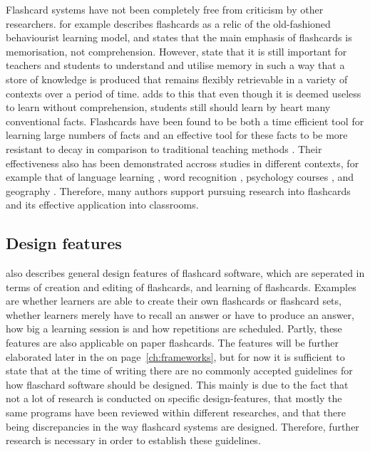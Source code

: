 Flashcard systems have not been completely free from criticism by other researchers.  for example describes flashcards as a relic of the old-fashioned behaviourist learning model, and  states that the main emphasis of flashcards is memorisation, not comprehension. However,  state that it is still important for teachers and students to understand and utilise memory in such a way that a store of knowledge is produced that remains flexibly retrievable in a variety of contexts over a period of time.  adds to this that even though it is deemed useless to learn without comprehension, students still should learn by heart many conventional facts. Flashcards have been found to be both a time efficient tool for learning large numbers of facts and an effective tool for these facts to be more resistant to decay in comparison to traditional teaching methods \cite{nakata}. Their effectiveness also has been demonstrated accross studies in different contexts, for example that of language learning \cite{chien, macquarrie, mccullough, nakata}, word recognition \cite{joseph}, psychology courses \cite{burgess, golding}, and geography \cite{zirkle}. Therefore, many authors support pursuing research into flashcards and its effective application into classrooms.

\subsection{Design features}

 also describes general design features of flashcard software, which are seperated in terms of creation and editing of flashcards, and learning of flashcards. Examples are whether learners are able to create their own flashcards or flashcard sets, whether learners merely have to recall an answer or have to produce an answer, how big a learning session is and how repetitions are scheduled. Partly, these features are also applicable on paper flashcards. The features will be further elaborated later in the  on page~\ref{ch:frameworks}, but for now it is sufficient to state that at the time of writing there are no commonly accepted guidelines for how flaschard software should be designed. This mainly is due to the fact that not a lot of research is conducted on specific design-features, that mostly the same programs have been reviewed within different researches, and that there being discrepancies in the way flashcard systems are designed. Therefore, further research is necessary in order to establish these guidelines.

